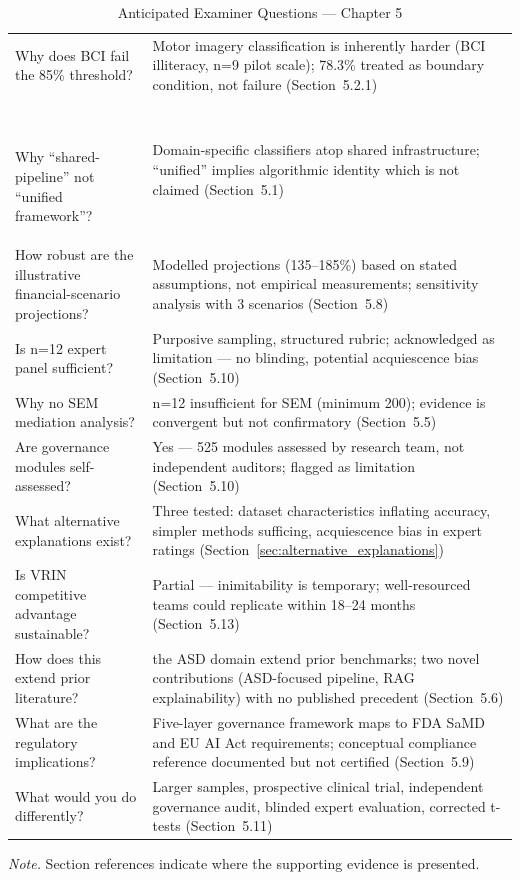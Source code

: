 \begin{table}[!htbp]
\caption{Anticipated Examiner Questions --- Chapter 5}
\tablefontsize\tablestripes
\begin{tabularx}{\textwidth}{@{} p{} L @{}}
\toprule
{} &  \\
\midrule
Why does BCI fail the 85\% threshold? & Motor imagery classification is inherently harder (BCI illiteracy, n=9 pilot scale); 78.3\% treated as boundary condition, not failure (Section~5.2.1) \\
\addlinespace
 \

\addlinespace
Why ``shared-pipeline'' not ``unified framework''? & Domain-specific classifiers atop shared infrastructure; ``unified'' implies algorithmic identity which is not claimed (Section~5.1) \\
\addlinespace
How robust are the illustrative financial-scenario projections? & Modelled projections (135--185\%) based on stated assumptions, not empirical measurements; sensitivity analysis with 3 scenarios (Section~5.8) \\
\addlinespace
Is n=12 expert panel sufficient? & Purposive sampling, structured rubric; acknowledged as limitation --- no blinding, potential acquiescence bias (Section~5.10) \\
\addlinespace
Why no SEM mediation analysis? & n=12 insufficient for SEM (minimum 200); evidence is convergent but not confirmatory (Section~5.5) \\
\addlinespace
Are governance modules self-assessed? & Yes --- 525 modules assessed by research team, not independent auditors; flagged as limitation (Section~5.10) \\
\addlinespace
What alternative explanations exist? & Three tested: dataset characteristics inflating accuracy, simpler methods sufficing, acquiescence bias in expert ratings (Section~\ref{sec:alternative_explanations}) \\
\addlinespace
Is VRIN competitive advantage sustainable? & Partial --- inimitability is temporary; well-resourced teams could replicate within 18--24 months (Section~5.13) \\
\addlinespace
How does this extend prior literature? & the ASD domain extend prior benchmarks; two novel contributions (ASD-focused pipeline, RAG explainability) with no published precedent (Section~5.6) \\
\addlinespace
What are the regulatory implications? & Five-layer governance framework maps to FDA SaMD and EU AI Act requirements; conceptual compliance reference documented but not certified (Section~5.9) \\
\addlinespace
What would you do differently? & Larger samples, prospective clinical trial, independent governance audit, blinded expert evaluation, corrected t-tests (Section~5.11) \\
\bottomrule
\end{tabularx}
\vspace{0.5em}\noindent\textit{Note.} Section references indicate where the supporting evidence is presented.
\end{table}
\fi %


